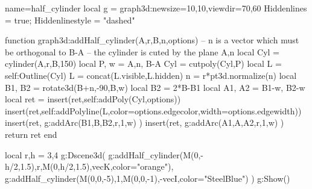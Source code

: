 \documentclass{standalone}
\begin{document}
\begin{luadraw}{name=half_cylinder}
local g = graph3d:new{size={10,10},viewdir={70,60}}
Hiddenlines = true; Hiddenlinestyle = "dashed"

function graph3d:addHalf_cylinder(A,r,B,n,options)
-- n is a vector which must be orthogonal to B-A
-- the cylinder is cuted by the plane {A,n}
    local Cyl = cylinder(A,r,B,150)
    local P, w = {A,n}, B-A
    Cyl = cutpoly(Cyl,P)
    local L = self:Outline(Cyl)
    L = concat(L.visible,L.hidden)
    n = r*pt3d.normalize(n)
    local B1, B2 = rotate3d(B+n,-90,{B,w})
    local B2 = 2*B-B1
    local A1, A2 = B1-w, B2-w
    local ret = {}
    insert(ret,self:addPoly(Cyl,options))
    insert(ret,self:addPolyline(L,{color=options.edgecolor,width=options.edgewidth}))
    insert(ret, g:addArc(B1,B,B2,r,1,w) )
    insert(ret, g:addArc(A1,A,A2,r,1,w) )
    return ret
end

local r,h = 3,4
g:Dscene3d(
    g:addHalf_cylinder(M(0,-h/2,1.5),r,M(0,h/2,1.5),vecK,{color="orange"}),
    g:addHalf_cylinder(M(0,0,-5),1,M(0,0,-1),-vecI,{color="SteelBlue"})
)
 g:Show()
\end{luadraw}
\end{document}
